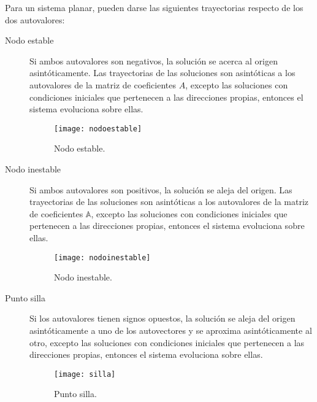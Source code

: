Para un sistema planar, pueden darse las siguientes trayectorias respecto de los dos autovalores:
\begin{description}

\item[Nodo estable]
Si ambos autovalores son negativos, la solución se acerca al origen asintóticamente.
Las trayectorias de las soluciones son asintóticas a los autovalores de la matriz de coeficientes $A$, excepto las soluciones con condiciones iniciales que pertenecen a las direcciones propias, entonces el sistema evoluciona sobre ellas.
%
\begin{figure}
\centering\texttt{[image: nodoestable]}
\caption{Nodo estable.}
\end{figure}

\item[Nodo inestable]
Si ambos autovalores son positivos, la solución se aleja del origen.
Las trayectorias de las soluciones son asintóticas a los autovalores de la matriz de coeficientes $\mathbb{A}$, excepto las soluciones con condiciones iniciales que pertenecen a las direcciones propias, entonces el sistema evoluciona sobre ellas.
%
\begin{figure}
\centering\texttt{[image: nodoinestable]}
\caption{Nodo inestable.}
\end{figure}

\item[Punto silla]
Si los autovalores tienen signos opuestos, la solución se aleja del origen asintóticamente a uno de los autovectores y se aproxima asintóticamente al otro, excepto las soluciones con condiciones iniciales que pertenecen a las direcciones propias, entonces el sistema evoluciona sobre ellas.
%
\begin{figure}
\centering\texttt{[image: silla]}
\caption{Punto silla.}
\end{figure}


\end{description}
